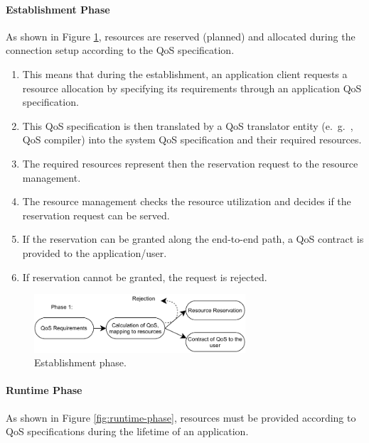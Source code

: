 \paragraph*{Establishment Phase}
As shown in Figure \ref{fig:establishment-phase}, resources are reserved (planned) and allocated during the connection setup according to the QoS specification. 
\begin{multicols}{2}
	\begin{enumerate}
		\item This means that during the establishment, an application client requests a resource allocation by specifying its requirements through an application QoS specification. 
		\item This QoS specification is then translated by a QoS translator entity (e.\ g.\ , QoS compiler) into the system QoS specification and their required resources.
		\item The required resources represent then the reservation request to the resource	management. 
		\item The resource management checks the resource utilization and decides if the reservation request can be served. 
		\item If the reservation can be granted along the end-to-end path, a QoS contract is provided to the application/user. 
		\item If reservation cannot be granted, the request is rejected.
	\end{enumerate}
\end{multicols}


\begin{figure}[tph]
	\centering
	\includegraphics[width=0.7\textwidth]{graphics/establishment-phase}
	\caption{Establishment phase.}
	\label{fig:establishment-phase}
\end{figure}



\paragraph*{Runtime Phase}
As shown in Figure \ref{fig:runtime-phase},  resources must be provided according to QoS specifications during the lifetime of an application. 

